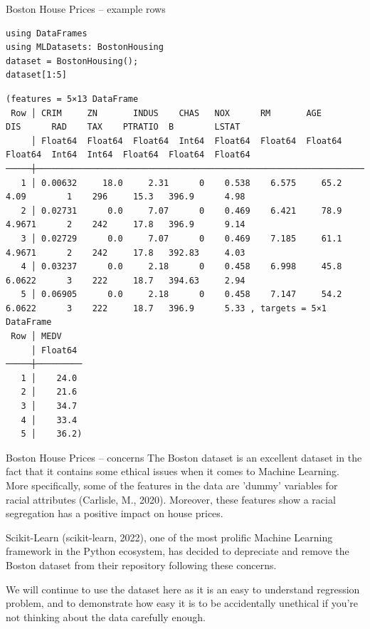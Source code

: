 \documentclass[10pt]{beamer}
\begin{document}
\begin{frame}[label={sec:org335974c},fragile]{Boston House Prices -- example rows}
 \begin{verbatim}
using DataFrames
using MLDatasets: BostonHousing
dataset = BostonHousing();
dataset[1:5]
\end{verbatim}

\begin{verbatim}
(features = 5×13 DataFrame
 Row │ CRIM     ZN       INDUS    CHAS   NOX      RM       AGE      DIS      RAD    TAX    PTRATIO  B        LSTAT   
     │ Float64  Float64  Float64  Int64  Float64  Float64  Float64  Float64  Int64  Int64  Float64  Float64  Float64 
─────┼────────────────────────────────────────────────────────────────────────────────────────────────────────────────
   1 │ 0.00632     18.0     2.31      0    0.538    6.575     65.2   4.09        1    296     15.3   396.9      4.98 
   2 │ 0.02731      0.0     7.07      0    0.469    6.421     78.9   4.9671      2    242     17.8   396.9      9.14
   3 │ 0.02729      0.0     7.07      0    0.469    7.185     61.1   4.9671      2    242     17.8   392.83     4.03
   4 │ 0.03237      0.0     2.18      0    0.458    6.998     45.8   6.0622      3    222     18.7   394.63     2.94
   5 │ 0.06905      0.0     2.18      0    0.458    7.147     54.2   6.0622      3    222     18.7   396.9      5.33 , targets = 5×1 DataFrame
 Row │ MEDV
     │ Float64
─────┼─────────
   1 │    24.0
   2 │    21.6
   3 │    34.7
   4 │    33.4
   5 │    36.2)
\end{verbatim}
\end{frame}

\begin{frame}[label={sec:org6ae6776}]{Boston House Prices -- concerns}
The Boston dataset is an excellent dataset in the fact that it contains some ethical
issues when it comes to Machine Learning. More specifically, some of the features in
the data are 'dummy' variables for racial attributes (Carlisle, M., 2020). Moreover, these features show a
racial segregation has a positive impact on house prices.

Scikit-Learn (scikit-learn, 2022), one of the most prolific Machine Learning framework in the Python
ecosystem, has decided to depreciate and remove the Boston dataset from their
repository following these concerns.

We will continue to use the dataset here as it is an easy to understand regression
problem, and to demonstrate how easy it is to be accidentally unethical if you're not
thinking about the data carefully enough. 
\end{frame}
\end{document}
